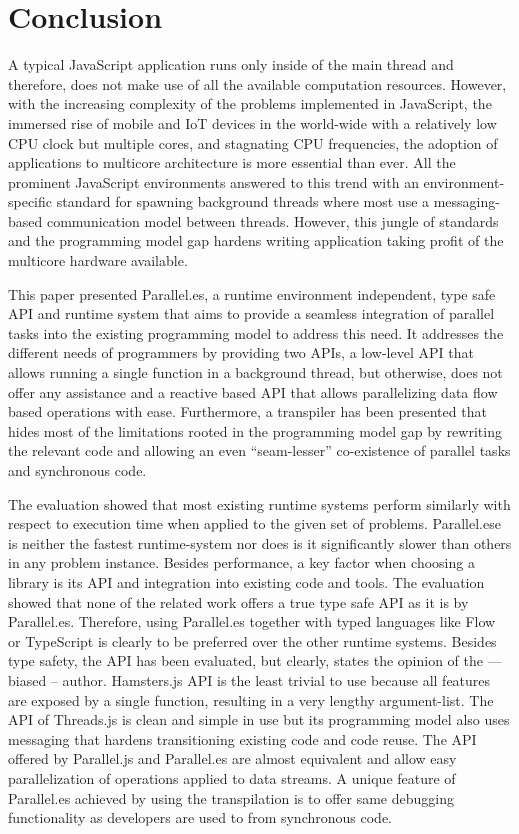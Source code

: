 \section{Conclusion}\label{sec:conclusion}
A typical JavaScript application runs only inside of the main thread and therefore, does not make use of all the available computation resources. However, with the increasing complexity of the problems implemented in JavaScript, the immersed rise of mobile and IoT devices in the world-wide with a relatively low CPU clock but multiple cores, and stagnating CPU frequencies, the adoption of applications to multicore architecture is more essential than ever. All the prominent JavaScript environments answered to this trend with an environment-specific standard for spawning background threads where most use a messaging-based communication model between threads. However, this jungle of standards and the programming model gap hardens writing application taking profit of the multicore hardware available. 

This paper presented Parallel.es, a runtime environment independent, type safe API and runtime system that aims to provide a seamless integration of parallel tasks into the existing programming model to address this need. It addresses the different needs of programmers by providing two APIs, a low-level API that allows running a single function in a background thread, but otherwise, does not offer any assistance and a reactive based API that allows parallelizing data flow based operations with ease. Furthermore, a  transpiler has been presented that hides most of the limitations rooted in the programming model gap by rewriting the relevant code and allowing an even \enquote{seam-lesser} co-existence of parallel tasks and synchronous code. 

The evaluation showed that most existing runtime systems perform similarly with respect to execution time when applied to the given set of problems. Parallel.ese is neither the fastest runtime-system nor does is it significantly slower than others in any problem instance. Besides performance, a key factor when choosing a library is its API and integration into existing code and tools. The evaluation showed that none of the related work offers a true type safe API as it is by Parallel.es. Therefore, using Parallel.es together with typed languages like Flow or TypeScript is clearly to be preferred over the other runtime systems. Besides type safety, the API has been evaluated, but clearly, states the opinion of the --- biased -- author. Hamsters.js API is the least trivial to use because all features are exposed by a single function, resulting in a very lengthy argument-list. The API of Threads.js is clean and simple in use but its programming model also uses messaging that hardens transitioning existing code and code reuse. The API offered by Parallel.js and Parallel.es are almost equivalent and allow easy parallelization of operations applied to data streams. A unique feature of Parallel.es achieved by using the transpilation is to offer same debugging functionality as developers are used to from synchronous code. 

